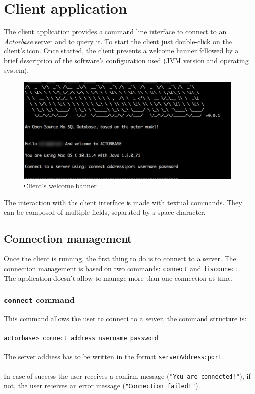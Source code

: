 \documentclass[a4paper]{article}
\begin{document}
	\section{Client application}
	The client application provides a command line interface to connect to an \emph{Actorbase} server and to query it. To start the client just double-click on the client's icon. Once started, the client presents a welcome banner followed by a brief description of the software's configuration used (JVM version and operating system).
	\begin{figure}[H]
		\centering
		\includegraphics[width=\textwidth]{welcomeClient.png}
		\caption{Client's welcome banner}
	\end{figure}
	The interaction with the client interface is made with textual commands. They can be composed of multiple fields, separated by a space character.
	
	\subsection{Connection management}
	Once the client is running, the first thing to do is to connect to a server. The connection management is based on two commands: \texttt{connect} and \texttt{disconnect}. The application doesn't allow to manage more than one connection at time.
	
	\subsubsection{\texttt{connect} command}
	This command allows the user to connect to a server, the command structure is:
	\\ \\
	\texttt{actorbase>	connect address username password}
	\\ \\
	The server address has to be written in the format \texttt{serverAddress:port}. \\ \\
	In case of success the user receives a confirm message (\texttt{"You are connected!"}), if not, the user receives an error message (\texttt{"Connection failed!"}).
	
\end{document}
